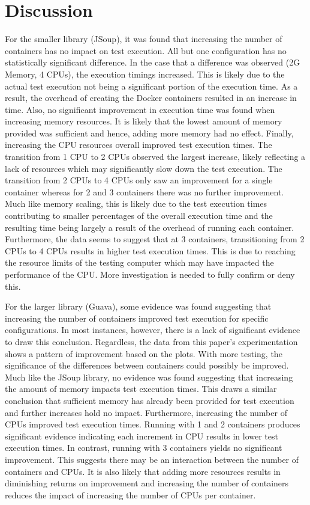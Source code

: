 \section{Discussion}
\label{Discussion}

For the smaller library (JSoup), it was found that increasing the number of containers has no impact on test execution. All but one configuration has no statistically significant difference. In the case that a difference was observed (2G Memory, 4 CPUs), the execution timings increased. This is likely due to the actual test execution not being a significant portion of the execution time. As a result, the overhead of creating the Docker containers resulted in an increase in time. Also, no significant improvement in execution time was found when increasing memory resources. It is likely that the lowest amount of memory provided was sufficient and hence, adding more memory had no effect. Finally, increasing the CPU resources overall improved test execution times. The transition from 1 CPU to 2 CPUs observed the largest increase, likely reflecting a lack of resources which may significantly slow down the test execution. The transition from 2 CPUs to 4 CPUs only saw an improvement for a single container whereas for 2 and 3 containers there was no further improvement. Much like memory scaling, this is likely due to the test execution times contributing to smaller percentages of the overall execution time and the resulting time being largely a result of the overhead of running each container. Furthermore, the data seems to suggest that at 3 containers, transitioning from 2 CPUs to 4 CPUs results in higher test execution times. This is due to reaching the resource limits of the testing computer which may have impacted the performance of the CPU. More investigation is needed to fully confirm or deny this. 

For the larger library (Guava), some evidence was found suggesting that increasing the number of containers improved test execution for specific configurations. In most instances, however, there is a lack of significant evidence to draw this conclusion. Regardless, the data from this paper’s experimentation shows a pattern of improvement based on the plots. With more testing, the significance of the differences between containers could possibly be improved. Much like the JSoup library, no evidence was found suggesting that increasing the amount of memory impacts test execution times. This draws a similar conclusion that sufficient memory has already been provided for test execution and further increases hold no impact. Furthermore, increasing the number of CPUs improved test execution times. Running with 1 and 2 containers produces significant evidence indicating each increment in CPU results in lower test execution times. In contrast, running with 3 containers yields no significant improvement. This suggests there may be an interaction between the number of containers and CPUs. It is also likely that adding more resources results in diminishing returns on improvement and increasing the number of containers reduces the impact of increasing the number of CPUs per container. 
